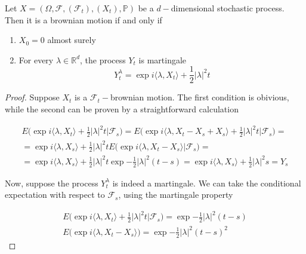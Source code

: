 \begin{theorem}
    Let $X = (\Omega,\mathcal{F},(\mathcal{F}_t),(X_t),\mathbb{P})$ be a $d-$dimensional stochastic process. Then it is a brownian motion if and only if 
    \begin{enumerate}
        \item $X_0 = 0$ almost surely
        \item For every $\lambda \in \mathbb{R}^d$, the process $Y_t$ is martingale
        \begin{equation*}
            Y_t^{\lambda} = \exp{i \langle \lambda, X_t \rangle + \frac{1}{2}\vert \lambda \vert^2 t}
        \end{equation*}
    \end{enumerate}
\end{theorem}
\begin{proof}
    Suppose $X_t$ is a $\mathcal{F}_t-$brownian motion. The first condition is obivious, while the second can be proven by a straightforward calculation

    \begin{gather*}
        E\Big( \exp{i \langle \lambda, X_t \rangle + \frac{1}{2}\vert \lambda \vert^2 t} \Big\vert \mathcal{F}_s \Big) = E\Big( \exp{i \langle \lambda, X_t-X_s+X_s \rangle + \frac{1}{2} \vert \lambda \vert^2 t}  \Big\vert \mathcal{F}_s \Big) = \\ 
        = \exp{i \langle \lambda, X_s \rangle + \frac{1}{2} \vert \lambda \vert^2 t} E\Big( \exp{i \langle \lambda, X_t-X_s \rangle} \Big\vert \mathcal{F}_s \Big) = \\ 
        = \exp{i \langle \lambda, X_s \rangle + \frac{1}{2} \vert \lambda \vert^2 t} \exp{-\frac{1}{2} \vert\lambda\vert^2 (t-s)} = \exp{i \langle \lambda, X_s \rangle + \frac{1}{2} \vert \lambda \vert^2 s} = Y_s
    \end{gather*}

    Now, suppose the process $Y_t^{\lambda}$ is indeed a martingale. We can take the conditional expectation with respect to $\mathcal{F}_s$, using the martingale property 

    \begin{gather*}
        E\Big( \exp{i \langle \lambda, X_t \rangle + \frac{1}{2}\vert \lambda \vert^2 t } \Big\vert \mathcal{F}_s \Big) = \exp{-\frac{1}{2} \vert \lambda \vert^2 (t-s)} \\
        E\Big( \exp{i \langle \lambda, X_t-X_s \rangle }\Big) = \exp{-\frac{1}{2}\vert \lambda \vert^2 (t-s)^2}
    \end{gather*}


\end{proof}
